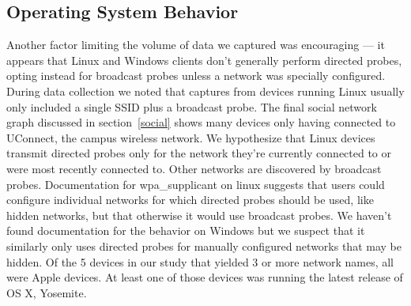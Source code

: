 \documentclass[letterpaper,twocolumn,10pt]{article}
\begin{document}
\subsection{Operating System Behavior}
Another factor limiting the volume of data we captured was encouraging --- it appears that Linux and Windows clients don't generally perform directed probes, opting instead for broadcast probes unless a network was specially configured. During data collection we noted that captures from devices running Linux usually only included a single SSID plus a broadcast probe. The final social network graph discussed in section~\ref{social} shows many devices only having connected to UConnect, the campus wireless network. We hypothesize that Linux devices transmit directed probes only for the network they're currently connected to or were most recently connected to. Other networks are discovered by broadcast probes. Documentation for wpa\_supplicant on linux suggests that users could configure individual networks for which directed probes should be used, like hidden networks, but that otherwise it would use broadcast probes. We haven't found documentation for the behavior on Windows but we suspect that it similarly only uses directed probes for manually configured networks that may be hidden. Of the 5 devices in our study that yielded 3 or more network names, all were Apple devices. At least one of those devices was running the latest release of OS X, Yosemite.
\end{document}
